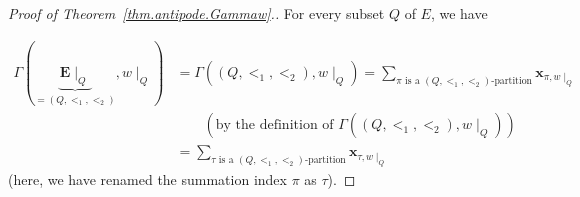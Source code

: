 \documentclass[12pt]{article}
\theoremstyle{plain}
\theoremstyle{definition}
\theoremstyle{remark}
\let\sumnonlimits\sum
\renewcommand{\sum}{\sumnonlimits\limits}
\newcommand{\xx}{{\mathbf{x}}}
\newcommand{\EE}{{\mathbf{E}}}
\begin{document}
\begin{proof}[Proof of Theorem~\ref{thm.antipode.Gammaw}.]
For every subset $Q$ of $E$, we have

\begin{align}
\Gamma\left(\underbrace{\EE\mid_Q}_{=\left(Q, <_1, <_2\right)}, w\mid_Q\right)
&= \Gamma\left(\left(Q, <_1, <_2\right), w\mid_Q\right)
\nonumber 
= \sum_{\pi \text{ is a }\left(Q, <_1, <_2\right)\text{-partition}}
\xx_{\pi, w\mid_Q}
\nonumber \\
& \qquad \left(\text{by the definition of }
 \Gamma\left(\left(Q, <_1, <_2\right), w\mid_Q\right) \right)
\nonumber \\
& = \sum_{\tau \text{ is a }\left(Q, <_1, <_2\right)\text{-partition}}
\xx_{\tau, w\mid_Q}
\label{pf.thm.antipode.Gammaw.Req.pf.Gamma2}
\end{align}
(here, we have renamed the summation index $\pi$ as
$\tau$).



\end{proof}
\end{document}
